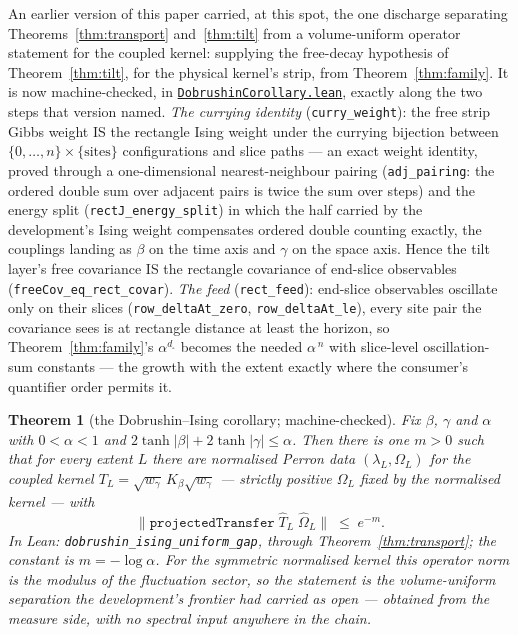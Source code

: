\documentclass[11pt]{article}
\newtheorem{theorem}{Theorem}[section]
\theoremstyle{definition}
\newcommand{\anchor}{c7b870b05bd6d1bec270d499e1358a64070ce0e1}
\newcommand{\repofile}[2]{%
  \href{https://github.com/lluiseriksson/THE-ERIKSSON-PROGRAMME/blob/\anchor/#1}{\nolinkurl{#2}}}
\begin{document}
An earlier version of this paper carried, at this spot, the one discharge
separating Theorems~\ref{thm:transport} and~\ref{thm:tilt} from a
volume-uniform operator statement for the coupled kernel: supplying the
free-decay hypothesis of Theorem~\ref{thm:tilt}, for the physical
kernel's strip, from Theorem~\ref{thm:family}.  It is now machine-checked,
in \repofile{YangMills/OS/DobrushinCorollary.lean}{DobrushinCorollary.lean},
exactly along the two steps that version named.  \emph{The currying
identity} (\texttt{curry\_weight}): the free strip Gibbs weight IS the
rectangle Ising weight under the currying bijection between
$\{0,\dots,n\}\times\{\text{sites}\}$ configurations and slice paths ---
an exact weight identity, proved through a one-dimensional
nearest-neighbour pairing (\texttt{adj\_pairing}: the ordered double sum
over adjacent pairs is twice the sum over steps) and the energy split
(\texttt{rectJ\_energy\_split}) in which the half carried by the
development's Ising weight compensates ordered double counting exactly,
the couplings landing as $\beta$ on the time axis and $\gamma$ on the
space axis.  Hence the tilt layer's free covariance IS the rectangle
covariance of end-slice observables (\texttt{freeCov\_eq\_rect\_covar}).
\emph{The feed} (\texttt{rect\_feed}): end-slice observables oscillate
only on their slices (\texttt{row\_deltaAt\_zero},
\texttt{row\_deltaAt\_le}), every site pair the covariance sees is at
rectangle distance at least the horizon, so
Theorem~\ref{thm:family}'s $\alpha^{d_\square}$ becomes the needed
$\alpha^{\,n}$ with slice-level oscillation-sum constants --- the growth
with the extent exactly where the consumer's quantifier order permits it.

\begin{theorem}[the Dobrushin--Ising corollary; machine-checked]
\label{thm:corollary}
Fix $\beta$, $\gamma$ and $\alpha$ with
$0<\alpha<1$ and $2\tanh|\beta|+2\tanh|\gamma|\le\alpha$.  Then there is
one $m>0$ such that for \emph{every} extent $L$ there are normalised
Perron data $(\lambda_L,\Omega_L)$ for the coupled kernel
$T_L=\sqrt{w_\gamma}\,K_\beta\sqrt{w_\gamma}$ --- strictly positive
$\Omega_L$ fixed by the normalised kernel --- with
\[
  \bigl\|\texttt{projectedTransfer}\;\hat T_L\;\hat\Omega_L\bigr\|
  \;\le\; e^{-m}.
\]
In Lean: \texttt{dobrushin\_ising\_uniform\_gap}, through
Theorem~\ref{thm:transport}; the constant is $m=-\log\alpha$.  For the
symmetric normalised kernel this operator norm is the modulus of the
fluctuation sector, so the statement is the volume-uniform separation
the development's frontier had carried as open --- obtained from the
measure side, with no spectral input anywhere in the chain.
\end{theorem}
\end{document}
